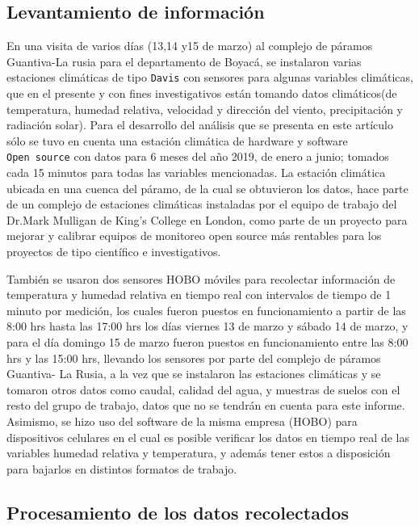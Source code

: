 \documentclass[conference,final,]{IEEEtran}
\begin{document}
\hypertarget{levantamiento-de-informaciuxf3n}{%
\subsection{Levantamiento de
información}\label{levantamiento-de-informaciuxf3n}}

En una visita de varios días (13,14 y15 de marzo) al complejo de páramos
Guantiva-La rusia para el departamento de Boyacá, se instalaron varias
estaciones climáticas de tipo \texttt{Davis} con sensores para algunas
variables climáticas, que en el presente y con fines investigativos
están tomando datos climáticos(de temperatura, humedad relativa,
velocidad y dirección del viento, precipitación y radiación solar). Para
el desarrollo del análisis que se presenta en este artículo sólo se tuvo
en cuenta una estación climática de hardware y software
\texttt{Open\ source} con datos para 6 meses del año 2019, de enero a
junio; tomados cada 15 minutos para todas las variables mencionadas. La
estación climática ubicada en una cuenca del páramo, de la cual se
obtuvieron los datos, hace parte de un complejo de estaciones climáticas
instaladas por el equipo de trabajo del Dr.Mark Mulligan de King's
College en London, como parte de un proyecto para mejorar y calibrar
equipos de monitoreo open source más rentables para los proyectos de
tipo científico e investigativos.

También se usaron dos sensores HOBO móviles para recolectar información
de temperatura y humedad relativa en tiempo real con intervalos de
tiempo de 1 minuto por medición, los cuales fueron puestos en
funcionamiento a partir de las 8:00 hrs hasta las 17:00 hrs los días
viernes 13 de marzo y sábado 14 de marzo, y para el día domingo 15 de
marzo fueron puestos en funcionamiento entre las 8:00 hrs y las 15:00
hrs, llevando los sensores por parte del complejo de páramos Guantiva-
La Rusia, a la vez que se instalaron las estaciones climáticas y se
tomaron otros datos como caudal, calidad del agua, y muestras de suelos
con el resto del grupo de trabajo, datos que no se tendrán en cuenta
para este informe. Asimismo, se hizo uso del software de la misma
empresa (HOBO) para dispositivos celulares en el cual es posible
verificar los datos en tiempo real de las variables humedad relativa y
temperatura, y además tener estos a disposición para bajarlos en
distintos formatos de trabajo.

\hypertarget{procesamiento-de-los-datos-recolectados}{%
\subsection{Procesamiento de los datos
recolectados}\label{procesamiento-de-los-datos-recolectados}}
\end{document}
